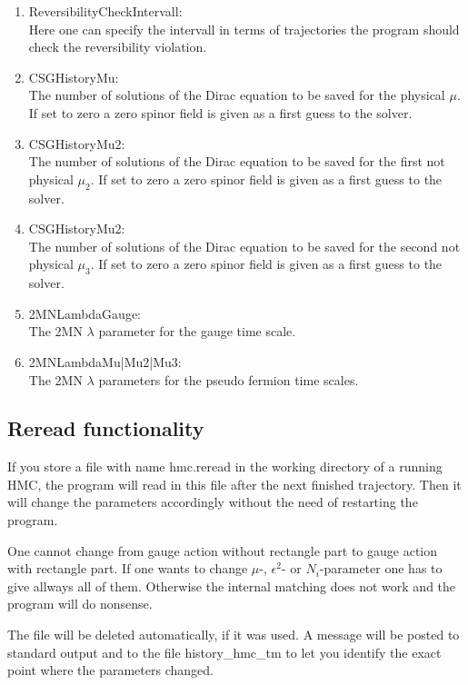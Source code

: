 \begin{enumerate}
\item {\ttfamily ReversibilityCheckIntervall}:\\
  Here one can specify the intervall in terms of trajectories the
  program should check the reversibility violation.

\item {\ttfamily CSGHistoryMu}:\\
  The number of solutions of the Dirac equation to be saved for the
  physical $\mu$. If set to zero a zero spinor field is given as a
  first guess to the solver.
  
\item {\ttfamily CSGHistoryMu2}:\\
  The number of solutions of the Dirac equation to be saved for the
  first not physical $\mu_2$. If set to zero a zero spinor field is
  given as a first guess to the solver. 
 
\item {\ttfamily CSGHistoryMu2}:\\
  The number of solutions of the Dirac equation to be saved for the
  second not physical $\mu_3$. If set to zero a zero spinor field is
  given as a first guess to the solver.
  
\item {\ttfamily 2MNLambdaGauge}:\\
  The 2MN $\lambda$ parameter for the gauge time scale.

\item {\ttfamily 2MNLambdaMu|Mu2|Mu3}:\\
  The 2MN $\lambda$ parameters for the pseudo fermion time scales.

\end{enumerate}

\subsection{Reread functionality}

If you store a file with name {\ttfamily hmc.reread} in the working
directory of a running HMC, the program will read in this file after
the next finished trajectory. Then it will change the parameters
accordingly without the need of restarting the program. 

One cannot change from gauge action without rectangle part to gauge
action with rectangle part. If one wants to change $\mu$-,
$\epsilon^2$- or $N_i$-parameter one has to give allways all of
them. Otherwise the internal matching does not work and the program
will do nonsense.

The file will be deleted automatically, if it was used. A message will
be posted to standard output and to the file {\ttfamily
  history\_hmc\_tm} to let you identify the exact point where the
parameters changed.

